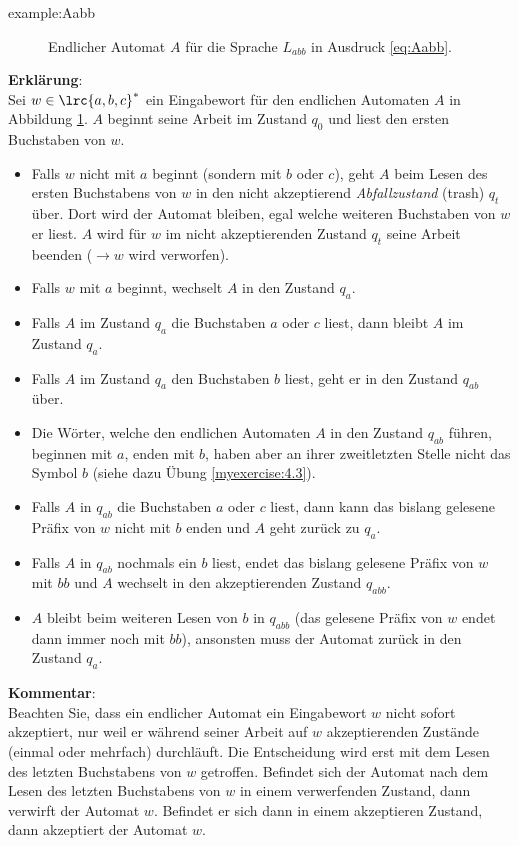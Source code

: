 \begin{example}{example:Aabb}
\begin{figure}[H]
		\caption{Endlicher Automat $A$ für die Sprache $L_{abb}$ in Ausdruck \cref{eq:Aabb}.}
		\label{fig:Aabb}
	\end{figure}
	\noindent
	\textbf{Erklärung}:\\
	Sei $w\in\lrc{a,b,c}^*$ ein Eingabewort für den endlichen Automaten $A$ in Abbildung \cref{fig:Aabb}. $A$ beginnt seine Arbeit im Zustand $q_0$ und liest den ersten Buchstaben von $w$.
	\begin{itemize}
		\item Falls $w$ nicht mit $a$ beginnt (sondern mit $b$ oder $c$), geht $A$ beim Lesen des ersten Buchstabens von $w$ in den nicht akzeptierend \textit{Abfallzustand} (trash) $q_t$ über. Dort wird der Automat bleiben, egal welche weiteren Buchstaben von $w$ er liest. $A$ wird für $w$ im nicht akzeptierenden Zustand $q_t$ seine Arbeit beenden ($\to w$ wird verworfen).
		\item Falls $w$ mit $a$ beginnt, wechselt $A$ in den Zustand $q_a$.
		\item Falls $A$ im Zustand $q_a$ die Buchstaben $a$ oder $c$ liest, dann bleibt $A$ im Zustand $q_a$.
		\item Falls $A$ im Zustand $q_a$ den Buchstaben $b$ liest, geht er in den Zustand $q_{ab}$ über.
		\item Die Wörter, welche den endlichen Automaten $A$ in den Zustand $q_{ab}$ führen, beginnen mit $a$, enden mit $b$, haben aber an ihrer zweitletzten Stelle nicht das Symbol $b$ (siehe dazu Übung \cref{myexercise:4.3}).
		\item Falls $A$ in $q_{ab}$ die Buchstaben $a$ oder $c$ liest, dann kann das bislang gelesene Präfix von $w$ nicht mit $b$ enden und $A$ geht zurück zu $q_a$.
		\item Falls $A$ in $q_{ab}$ nochmals ein $b$ liest, endet das bislang gelesene Präfix von $w$ mit $bb$ und $A$ wechselt in den akzeptierenden Zustand $q_{abb}$.
		\item $A$ bleibt beim weiteren Lesen von $b$ in $q_{abb}$ (das gelesene Präfix von $w$ endet dann immer noch mit $bb$), ansonsten muss der Automat zurück in den Zustand $q_a$.
	\end{itemize}
\end{example}
\noindent
\textbf{Kommentar}:\\
Beachten Sie, dass ein endlicher Automat ein Eingabewort $w$ nicht sofort akzeptiert, nur weil er während seiner Arbeit auf $w$ akzeptierenden Zustände (einmal oder mehrfach) durchläuft. Die Entscheidung  wird erst mit dem Lesen des letzten Buchstabens von $w$ getroffen. Befindet sich der Automat nach dem Lesen des letzten Buchstabens von $w$ in einem verwerfenden Zustand, dann verwirft der Automat $w$. Befindet er sich dann in einem akzeptieren Zustand, dann akzeptiert der Automat $w$.\\
